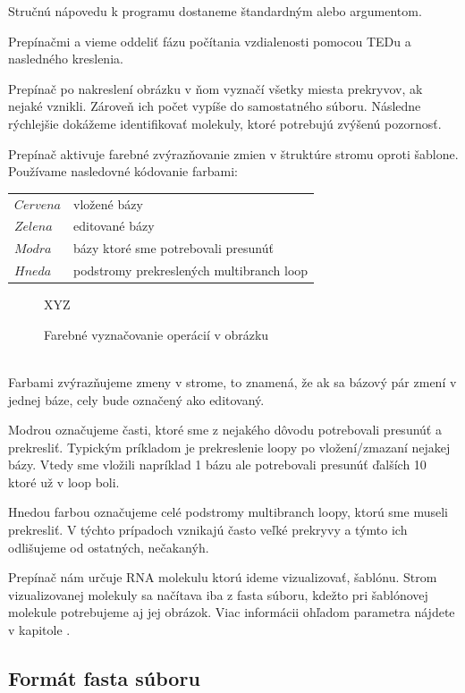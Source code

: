 Stručnú nápovedu k programu dostaneme štandardným  alebo  argumentom.

Prepínačmi  a  vieme oddeliť fázu počítania vzdialenosti pomocou TEDu a nasledného kreslenia.

Prepínač  po nakreslení obrázku v ňom vyznačí všetky miesta prekryvov, ak nejaké vznikli.
Zároveň ich počet vypíše do samostatného súboru. Následne rýchlejšie dokážeme identifikovať molekuly, ktoré
potrebujú zvýšenú pozornosť.

Prepínač  aktivuje farebné zvýrazňovanie zmien v štruktúre stromu oproti šablone.
Používame nasledovné kódovanie farbami:

\begin{tabular}{@{$\bullet$ }ll}
  $Cervena$ & vložené bázy
  \\
  $Zelena$  & editované bázy
  \\
  $Modra$   & bázy ktoré sme potrebovali presunúť
  \\
  $Hneda$   & podstromy prekreslených multibranch loop
\end{tabular}
\begin{figure}
  XYZ
\caption{Farebné vyznačovanie operácií v obrázku}
\label{tab:traveler_colors}
\end{figure}
\\

Farbami zvýrazňujeme zmeny v strome, to znamená, že ak sa bázový pár zmení v jednej báze,
cely bude označený ako editovaný.

Modrou označujeme časti, ktoré sme z nejakého dôvodu potrebovali presunúť a prekresliť. Typickým príkladom
je prekreslenie loopy po vložení/zmazaní nejakej bázy. Vtedy sme vložili napríklad 1 bázu ale potrebovali
presunúť ďalších 10 ktoré už v loop boli.

Hnedou farbou označujeme celé podstromy multibranch loopy, ktorú sme museli prekresliť.
V týchto prípadoch vznikajú často veľké prekryvy a týmto ich odlišujeme od ostatných, nečakanýh.

Prepínač  nám určuje RNA molekulu ktorú ideme vizualizovať, 
šablónu. Strom vizualizovanej molekuly sa načítava iba z fasta súboru, kdežto pri šablónovej molekule
potrebujeme aj jej obrázok. Viac informácii ohľadom parametra  nájdete v kapitole .

\subsection{Formát fasta súboru}

